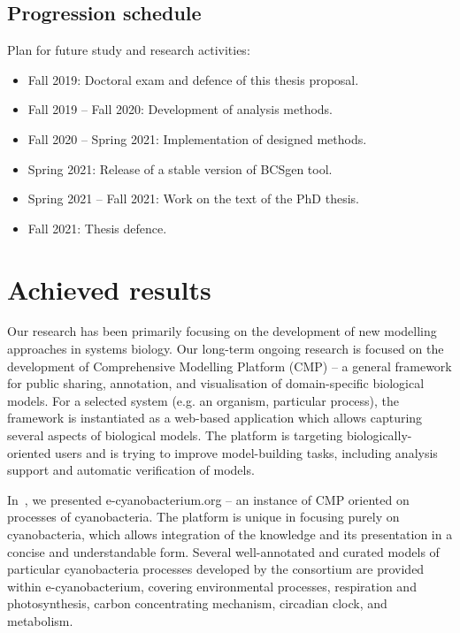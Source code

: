 \documentclass[11pt,a4paper]{report}
\begin{document}
\section{Progression schedule}

Plan for future study and research activities:

\begin{itemize}
\item Fall 2019: Doctoral exam and defence of this thesis proposal.
\item Fall 2019 -- Fall 2020: Development of analysis methods.
\item Fall 2020 -- Spring 2021: Implementation of designed methods.
\item Spring 2021: Release of a stable version of BCSgen tool.
\item Spring 2021 -- Fall 2021: Work on the text of the PhD thesis.
\item Fall 2021: Thesis defence.
\end{itemize}


\chapter{Achieved results}

Our research has been primarily focusing on the development of new modelling approaches in systems biology. Our long-term ongoing research is focused on the development of Comprehensive Modelling Platform (CMP) -- a general framework for public sharing, annotation, and visualisation of domain-specific biological models. For a selected system (e.g. an organism, particular process), the framework is instantiated as a web-based application which allows capturing several aspects of biological models. The platform is targeting biologically-oriented users and is trying to improve model-building tasks, including analysis support and automatic verification of models.

In~\cite{trojak2016cyanobacterium}, we presented e-cyanobacterium.org -- an instance of CMP oriented on processes of cyanobacteria. The platform is unique in focusing purely on cyanobacteria, which allows integration of the knowledge and its presentation in a concise and understandable form. Several well-annotated and curated models of particular cyanobacteria processes developed by the consortium are provided within e-cyanobacterium, covering environmental processes, respiration and photosynthesis, carbon concentrating mechanism, circadian clock, and metabolism.
\end{document}
